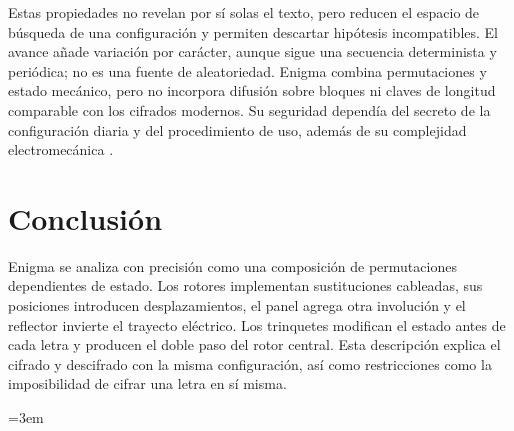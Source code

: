 \documentclass[letterpaper,12pt]{article}
\begin{document}
Estas propiedades no revelan por sí solas el texto, pero reducen el espacio de búsqueda de una configuración y permiten descartar hipótesis incompatibles. El avance añade variación por carácter, aunque sigue una secuencia determinista y periódica; no es una fuente de aleatoriedad. Enigma combina permutaciones y estado mecánico, pero no incorpora difusión sobre bloques ni claves de longitud comparable con los cifrados modernos. Su seguridad dependía del secreto de la configuración diaria y del procedimiento de uso, además de su complejidad electromecánica \cite{miller-enigma}.

\section{Conclusión}
Enigma se analiza con precisión como una composición de permutaciones dependientes de estado. Los rotores implementan sustituciones cableadas, sus posiciones introducen desplazamientos, el panel agrega otra involución y el reflector invierte el trayecto eléctrico. Los trinquetes modifican el estado antes de cada letra y producen el doble paso del rotor central. Esta descripción explica el cifrado y descifrado con la misma configuración, así como restricciones como la imposibilidad de cifrar una letra en sí misma.

{\footnotesize\emergencystretch=3em\printbibliography[heading=bibintoc,title={Referencias}]}
\end{document}
